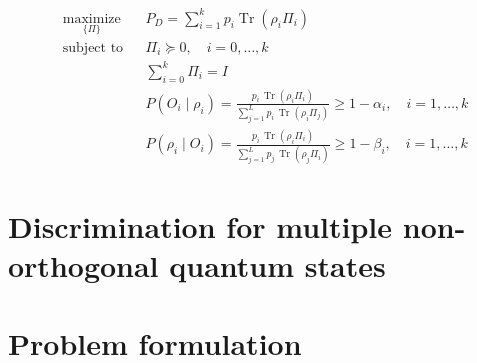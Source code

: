 \documentclass[11pt]{article}
\theoremstyle{definition}
\begin{document}
\begin{align}
     & \underset{\{\Pi\}}{\text{maximize}} &  & P_{D}=\sum_{i=1}^{k} p_{i} \operatorname{Tr}(\rho_{i} \Pi_{i})                                                                                                      \\
     & \text{subject to}                   &  & \Pi_{i} \succeq 0, \quad i = 0, \ldots, k                                                                                                                           \\
     &                                     &  & \sum_{i=0}^{k} \Pi_i = I                                                                                                                                            \\
     &                                     &  & P(O_i \mid \rho_i) = \frac{p_i \, \operatorname{Tr}(\rho_i \Pi_i)}{\sum_{j=1}^{L} p_i \, \operatorname{Tr}(\rho_i \Pi_j)} \geq 1 - \alpha_i, \quad i = 1, \ldots, k \\
     &                                     &  & P(\rho_i \mid O_i) = \frac{p_i \, \operatorname{Tr}(\rho_i \Pi_i)}{\sum_{j=1}^{L} p_j \, \operatorname{Tr}(\rho_j \Pi_i)} \geq 1 - \beta_i, \quad i = 1, \ldots, k
\end{align}




\section{Discrimination for multiple non-orthogonal quantum states}
\section{Problem formulation}
\end{document}
